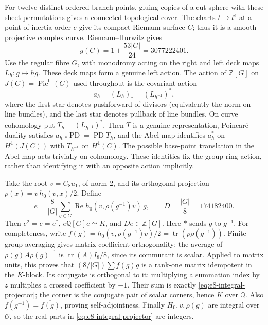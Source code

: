 For twelve distinct ordered branch points, gluing copies of a cut sphere
with these sheet permutations gives a connected topological cover.
The charts \(t\mapsto t^e\) at a point of inertia order \(e\)
give its compact Riemann surface \(C\); thus it is a smooth projective
complex curve. Riemann--Hurwitz gives
\[
 g(C)=1+\frac{53|G|}{24}=3077222401.
\]
Use the regular fibre \(G\), with monodromy acting on the right and
left deck maps \(L_h:g\mapsto hg\). These deck maps form a genuine
left action. The action of \(\mathbb Z[G]\) on \(J(C)=\operatorname{Pic}^0(C)\)
used throughout is the covariant action
\[
 a_h=(L_h)_*=(L_{h^{-1}})^*,
\]
where the first star denotes pushforward of divisors (equivalently
the norm on line bundles), and the last star denotes pullback of line
bundles. On curve cohomology put \(T_h=(L_{h^{-1}})^*\). Then \(T\)
is a genuine representation, Poincar\'e duality satisfies
\(a_{h,*}\operatorname{PD}=\operatorname{PD}T_h\), and the Abel map
identifies \(a_h^*\) on \(H^1(J(C))\) with \(T_{h^{-1}}\) on
\(H^1(C)\). The possible base-point translation in the Abel map
acts trivially on cohomology. These identities fix the group-ring
action, rather than identifying it with an opposite action implicitly.

Take the root \(v=C_8u_1\), of norm 2, and its orthogonal projection
\(p(x)=v\,h_0(v,x)/2\). Define
\begin{equation}\label{eq:e8-integral-projector}
 e=\frac8{|G|}\sum_{g\in G}
       \operatorname{Re}h_0(v,\rho(g^{-1})v)\,g,
 \qquad D=\frac{|G|}{8}=174182400.
\end{equation}
Then \(e^2=e=e^*\), \(e\mathbb Q[G]e\simeq K\), and
\(De\in\mathbb Z[G]\). Here \(*\) sends \(g\) to \(g^{-1}\).
For completeness, write
\(f(g)=h_0(v,\rho(g^{-1})v)/2=\operatorname{tr}(p\rho(g^{-1}))\).
Finite-group averaging gives matrix-coefficient orthogonality:
the average of \(\rho(g)A\rho(g)^{-1}\) is
\(\operatorname{tr}(A)I_8/8\), since its commutant is scalar.
Applied to matrix units, this proves that
\((8/|G|)\sum f(g)g\) is a rank-one matrix idempotent in the
\(K\)-block. Its conjugate is orthogonal to it: multiplying a summation
index by \(z\) multiplies a crossed coefficient by \(-1\).
Their sum is exactly \eqref{eq:e8-integral-projector}; the corner is
the conjugate pair of scalar corners, hence \(K\) over \(\mathbb Q\).
Also \(f(g^{-1})=\overline{f(g)}\), proving self-adjointness.
Finally \(H_0,v,\rho(g)\) are integral over \(\mathcal O\), so the
real parts in \eqref{eq:e8-integral-projector} are integers.

